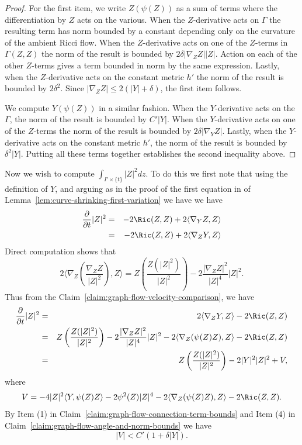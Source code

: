 \begin{proof}
For the first item, we write $Z(\psi(Z))$ as a sum of terms where the
differentiation by $Z$ acts on the various. When the $Z$-derivative acts on
$\Gamma$ the resulting term has norm bounded by a constant depending only on
the curvature of the ambient Ricci flow. When the $Z$-derivative acts on one of
the $Z$-terms in $\Gamma(Z,Z)$ the norm of the result is bounded by
$2\delta|\nabla_ZZ||Z|$. Action on each of the other $Z$-terms gives a term
bounded in norm by the same expression. Lastly, when the $Z$-derivative acts on
the constant metric $h'$ the norm of the result is bounded by $2\delta^2$.
Since $|\nabla_ZZ|\le 2(|Y|+\delta)$, the first item follows.

We compute $Y(\psi(Z))$ in a similar fashion. When the $Y$-derivative acts on
the $\Gamma$, the norm of the result is bounded by $C'|Y|$. When the
$Y$-derivative acts on one of the $Z$-terms the norm of the result is bounded
by $2\delta|\nabla_YZ|$. Lastly, when the $Y$-derivative acts on the constant
metric $h'$, the norm of the result is bounded by $\delta^2|Y|$. Putting all
these terms together establishes the second inequality above.
\end{proof}







Now we wish to compute $\int_{I'\times\{t\}}|Z|^2dz.$ To do this we
first note that using the definition of $Y$, and arguing as in the
proof of the first equation in of Lemma~\ref{lem:curve-shrinking-first-variation} we have we
have
\begin{eqnarray*}\frac{\partial}{\partial t}|Z|^2
& = & -2\Ric(Z,Z)+2\langle \nabla_YZ,Z\rangle \\
& = & -2\Ric(Z,Z)+2\langle \nabla_ZY,Z\rangle \end{eqnarray*}
Direct computation shows that
$$2\langle
\nabla_Z\left(\frac{\nabla_ZZ}{|Z|^2}\right),Z\rangle
=Z\left(\frac{Z(|Z|^2)}{|Z|^2}\right)-2\frac{|\nabla_ZZ|^2}{|Z|^4}|Z|^2.$$ Thus
from the Claim~\ref{claim:graph-flow-velocity-comparison}, we have
\begin{eqnarray}\label{Z_t}
\frac{\partial}{\partial t}|Z|^2 & = & 2\langle\nabla_ZY,Z\rangle -2\Ric(Z,Z)\nonumber \\
& = &
Z\left(\frac{Z(|Z|^2)}{|Z|^2}\right)-2\frac{|\nabla_ZZ|^2}{|Z|^4}|Z|^2-2\langle
\nabla_Z(\psi(Z)Z),Z\rangle-2\Ric(Z,Z) \nonumber \\
& = & Z\left(\frac{Z(|Z|^2)}{|Z|^2}\right)-2|Y|^2|Z|^2 +V,
\end{eqnarray}
where $$V=-4|Z|^2\langle Y,\psi(Z)Z\rangle-2\psi^2(Z)|Z|^4-2\langle
\nabla_Z(\psi(Z)Z),Z\rangle-2\Ric(Z,Z).$$ By Item (1) in
Claim~\ref{claim:graph-flow-connection-term-bounds} and Item (4) in Claim~\ref{claim:graph-flow-angle-and-norm-bounds} we have
\begin{equation}\label{Vest}
|V|<C'(1+\delta|Y|).
\end{equation}





